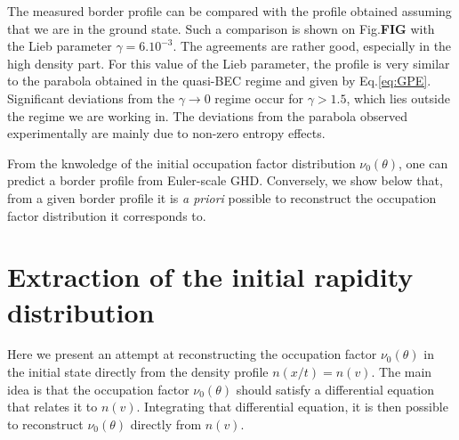 \documentclass[submission, Phys]{SciPost}
\begin{document}
The measured border profile  can be compared with the profile obtained assuming that we are in the ground state. Such a comparison is shown on Fig.\textbf{FIG} with the Lieb parameter $\gamma = 6.10^{-3}$. The agreements are rather good, especially in the high density part. For this value of the Lieb parameter, the profile is very similar to the parabola obtained in the quasi-BEC regime and given by Eq.\eqref{eq:GPE}. Significant deviations from the $\gamma \to 0$ regime occur for $\gamma > 1.5$, which lies outside the regime we are working in. The deviations from the parabola observed experimentally are mainly due to non-zero entropy effects.


From the knwoledge of the initial occupation factor
distribution $\nu_0(\theta)$, one can predict 
a border profile from Euler-scale GHD. %
Conversely, we show below that, from a given border profile it is 
{\it a priori} possible to reconstruct the occupation factor distribution  it corresponds to. 

\section{Extraction of the initial rapidity distribution}



Here we present an attempt at reconstructing the occupation factor $\nu_0(\theta)$ in the initial state directly from the density profile $n(x/t) = n(v)$. The main idea is that the occupation factor $\nu_0(\theta)$ should satisfy a differential equation that relates it to $n(v)$. Integrating that differential equation, it is then possible to reconstruct $\nu_0(\theta)$ directly from $n(v)$.
\end{document}
